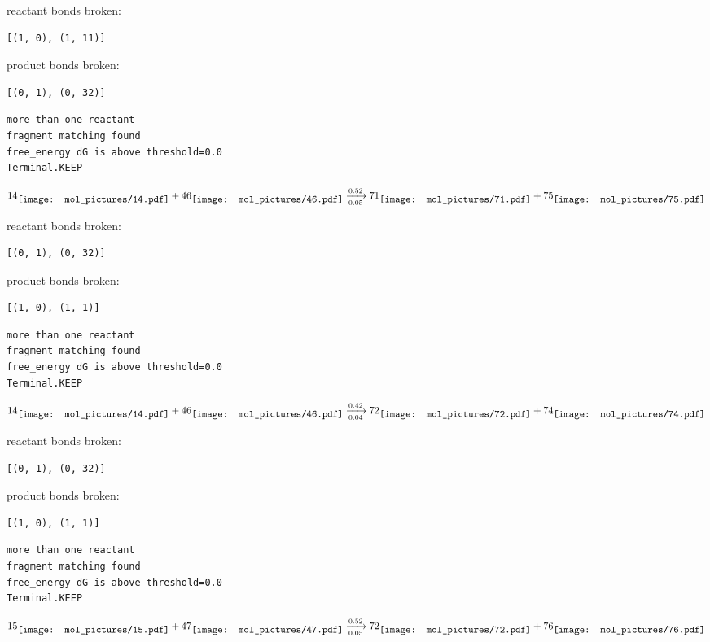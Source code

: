 \documentclass{article}
\begin{document}
reactant bonds broken:\begin{verbatim}
[(1, 0), (1, 11)]
\end{verbatim}
product bonds broken:\begin{verbatim}
[(0, 1), (0, 32)]
\end{verbatim}




\vspace{1cm}
\begin{verbatim}
more than one reactant
fragment matching found
free_energy dG is above threshold=0.0
Terminal.KEEP
\end{verbatim}
$$
14
\raisebox{-.5\height}{\texttt{[image: mol\_pictures/14.pdf]}}
+
46
\raisebox{-.5\height}{\texttt{[image: mol\_pictures/46.pdf]}}
\xrightarrow[0.05]{0.52}
71
\raisebox{-.5\height}{\texttt{[image: mol\_pictures/71.pdf]}}
+
75
\raisebox{-.5\height}{\texttt{[image: mol\_pictures/75.pdf]}}
$$


reactant bonds broken:\begin{verbatim}
[(0, 1), (0, 32)]
\end{verbatim}
product bonds broken:\begin{verbatim}
[(1, 0), (1, 1)]
\end{verbatim}




\vspace{1cm}
\begin{verbatim}
more than one reactant
fragment matching found
free_energy dG is above threshold=0.0
Terminal.KEEP
\end{verbatim}
$$
14
\raisebox{-.5\height}{\texttt{[image: mol\_pictures/14.pdf]}}
+
46
\raisebox{-.5\height}{\texttt{[image: mol\_pictures/46.pdf]}}
\xrightarrow[0.04]{0.42}
72
\raisebox{-.5\height}{\texttt{[image: mol\_pictures/72.pdf]}}
+
74
\raisebox{-.5\height}{\texttt{[image: mol\_pictures/74.pdf]}}
$$


reactant bonds broken:\begin{verbatim}
[(0, 1), (0, 32)]
\end{verbatim}
product bonds broken:\begin{verbatim}
[(1, 0), (1, 1)]
\end{verbatim}




\vspace{1cm}
\begin{verbatim}
more than one reactant
fragment matching found
free_energy dG is above threshold=0.0
Terminal.KEEP
\end{verbatim}
$$
15
\raisebox{-.5\height}{\texttt{[image: mol\_pictures/15.pdf]}}
+
47
\raisebox{-.5\height}{\texttt{[image: mol\_pictures/47.pdf]}}
\xrightarrow[0.05]{0.52}
72
\raisebox{-.5\height}{\texttt{[image: mol\_pictures/72.pdf]}}
+
76
\raisebox{-.5\height}{\texttt{[image: mol\_pictures/76.pdf]}}
$$
\end{document}
